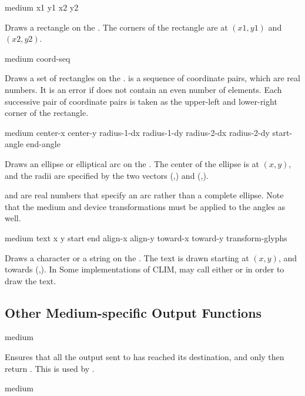  {medium x1 y1 x2 y2}

Draws a rectangle on the  .  The corners of the
rectangle are at $(x1,y1)$ and $(x2,y2)$.

 {medium coord-seq}

Draws a set of rectangles on the  .   is
a sequence of coordinate pairs, which are real numbers.  It is an error if
 does not contain an even number of elements.  Each successive
pair of coordinate pairs is taken as the upper-left and lower-right corner of
the rectangle.

 {medium center-x center-y
                                    radius-1-dx radius-1-dy radius-2-dx radius-2-dy
                                    start-angle end-angle}


Draws an ellipse or elliptical arc on the  .  The
center of the ellipse is at $(x,y)$, and the radii are specified by the two
vectors (,) and
(,).

 and  are real numbers that specify an arc
rather than a complete ellipse.  Note that the medium and device transformations
must be applied to the angles as well.

 {medium text x y start end
                                 align-x align-y toward-x toward-y
                                 transform-glyphs}

Draws a character or a string on the  .  The text is
drawn starting at $(x,y)$, and towards (,).  In Some
implementations of CLIM,  may call either
 or  in order to draw the
text.

\subsection {Other Medium-specific Output Functions}

 {medium}

Ensures that all the output sent to  has reached its destination,
and only then return .  This is used by .

 {medium}

